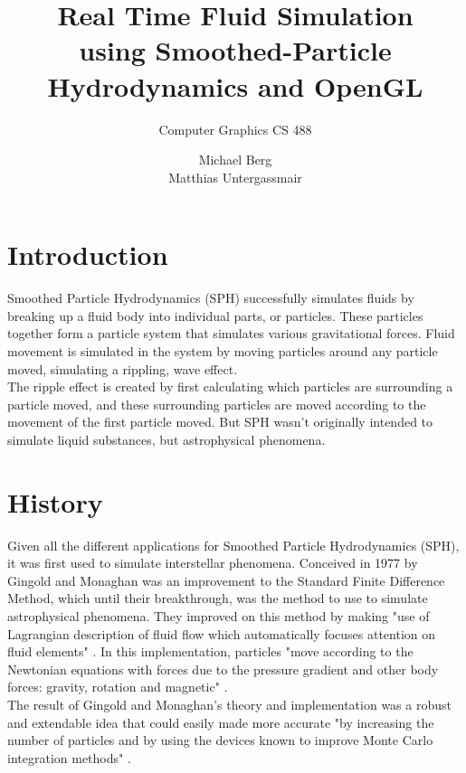 \documentclass[fontsize=11pt]{scrartcl}
\title{Real Time Fluid Simulation \\ \smaller using Smoothed-Particle Hydrodynamics and OpenGL}
\subtitle{Computer Graphics CS 488}
\author{Michael Berg \\ Matthias Untergassmair}
\begin{document}
\maketitle


\clearpage

\section{Introduction}
%
\hspace{6 pt} Smoothed Particle Hydrodynamics (SPH) successfully simulates fluids by breaking up a 
fluid body into individual parts, or particles. These particles together form a particle 
system that simulates various gravitational forces. Fluid movement is simulated in the 
system by moving particles around any particle moved, simulating a rippling, wave effect.
\\
\hspace*{6 pt} The ripple effect is created by first calculating which particles are surrounding 
a particle moved, and these surrounding particles are moved according to the movement 
of the first particle moved. But SPH wasn't originally intended to simulate liquid 
substances, but astrophysical phenomena.
%

\section{History}
%
\hspace{6 pt} Given all the different applications for Smoothed Particle Hydrodynamics (SPH),
it was first used to simulate interstellar phenomena. Conceived in 1977 by Gingold and 
Monaghan was an improvement to the Standard Finite Difference Method, which until their 
breakthrough, was the method to use to simulate astrophysical phenomena. They improved 
on this method by making "use of Lagrangian description of fluid flow which automatically 
focuses attention on fluid elements" \cite{sphastrophysics}. In this implementation, particles 
"move according to the Newtonian equations with forces due to the pressure gradient and 
other body forces: gravity, rotation and magnetic" \cite{sphastrophysics}.
\\
\hspace*{6 pt} The result of Gingold and Monaghan's theory and implementation was a robust 
and extendable idea that could easily made more accurate "by increasing the number of particles 
and by using the devices known to improve Monte Carlo integration methods" \cite{sphastrophysics}.
%
\end{document}
